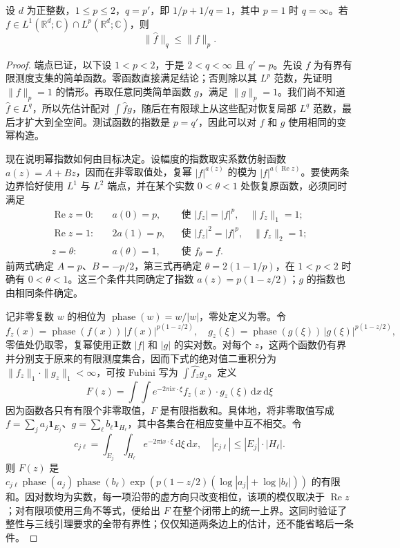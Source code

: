 \begin{theorem}\label{b2:thm:04-hausdorff-young}
设 \(d\) 为正整数，\(1\leq p\leq2\)，\(q=p'\)，即 \(1/p+1/q=1\)，其中 \(p=1\) 时 \(q=\infty\)。若 \(f\in L^1(\mathbb R^d;\mathbb C)\cap L^p(\mathbb R^d;\mathbb C)\)，则
\[
 \|\widehat f\|_q\leq\|f\|_p.
\]
\end{theorem}
\begin{proof}
端点已证，以下设 \(1<p<2\)，于是 \(2<q<\infty\) 且 \(q'=p\)。先设 \(f\) 为有界有限测度支集的简单函数。零函数直接满足结论；否则除以其 \(L^p\) 范数，先证明 \(\|f\|_p=1\) 的情形。再取任意同类简单函数 \(g\)，满足 \(\|g\|_p=1\)。我们尚不知道 \(\widehat f\in L^q\)，所以先估计配对 \(\int\widehat f g\)，随后在有限球上从这些配对恢复局部 \(L^q\) 范数，最后才扩大到全空间。测试函数的指数是 \(p=q'\)，因此可以对 \(f\) 和 \(g\) 使用相同的变幂构造。

现在说明幂指数如何由目标决定。设幅度的指数取实系数仿射函数 \(a(z)=A+Bz\)，因而在非零取值处，复幂 \(|f|^{a(z)}\) 的模为 \(|f|^{a(\operatorname{Re}z)}\)。要使两条边界恰好使用 \(L^1\) 与 \(L^2\) 端点，并在某个实数 \(0<\theta<1\) 处恢复原函数，必须同时满足
\[
 \begin{aligned}
  \operatorname{Re}z=0:&\quad a(0)=p,
       &&\text{使 }|f_z|=|f|^p,\quad\|f_z\|_1=1;\\
  \operatorname{Re}z=1:&\quad 2a(1)=p,
       &&\text{使 }|f_z|^2=|f|^p,\quad\|f_z\|_2=1;\\
  z=\theta:&\quad a(\theta)=1,
       &&\text{使 }f_\theta=f.
 \end{aligned}
\]
前两式确定 \(A=p\)、\(B=-p/2\)，第三式再确定 \(\theta=2(1-1/p)\)，在 \(1<p<2\) 时确有 \(0<\theta<1\)。这三个条件共同确定了指数 \(a(z)=p(1-z/2)\)；\(g\) 的指数也由相同条件确定。

记非零复数 \(w\) 的相位为 \(\operatorname{phase}(w)=w/|w|\)，零处定义为零。令
\[
 f_z(x)=\operatorname{phase}(f(x))\,|f(x)|^{p(1-z/2)},
 \quad g_z(\xi)=\operatorname{phase}(g(\xi))\,|g(\xi)|^{p(1-z/2)},
\]
零值处仍取零，复幂使用正数 \(|f|\) 和 \(|g|\) 的实对数。对每个 \(z\)，这两个函数仍有界并分别支于原来的有限测度集合，因而下式的绝对值二重积分为 \(\|f_z\|_1\cdot\|g_z\|_1<\infty\)，可按 Fubini 写为 \(\int\widehat {f_z}g_z\)。定义
\[
 F(z)=\int\!\int e^{-2\pi\mathrm{i}x\cdot\xi}f_z(x)\cdot g_z(\xi)\,\mathrm{d}x\,\mathrm{d}\xi
\]
因为函数各只有有限个非零取值，\(F\) 是有限指数和。具体地，将非零取值写成 \(f=\sum_j a_j\mathbf1_{E_j}\)、\(g=\sum_\ell b_\ell\mathbf1_{H_\ell}\)，其中各集合在相应变量中互不相交。令
\[
 c_{j\ell}=\int_{E_j}\int_{H_\ell}e^{-2\pi\mathrm{i}x\cdot\xi}\,\mathrm{d}\xi\,\mathrm{d}x,
 \quad |c_{j\ell}|\leq |E_j|\cdot|H_\ell|.
\]
则 \(F(z)\) 是 \(c_{j\ell}\operatorname{phase}(a_j)\operatorname{phase}(b_\ell)\exp(p(1-z/2)(\log|a_j|+\log|b_\ell|))\) 的有限和。因对数均为实数，每一项沿带的虚方向只改变相位，该项的模仅取决于 \(\operatorname{Re}z\)；对有限项使用三角不等式，便给出 \(F\) 在整个闭带上的统一上界。这同时验证了整性与三线引理要求的全带有界性；仅仅知道两条边上的估计，还不能省略后一条件。


\end{proof}
